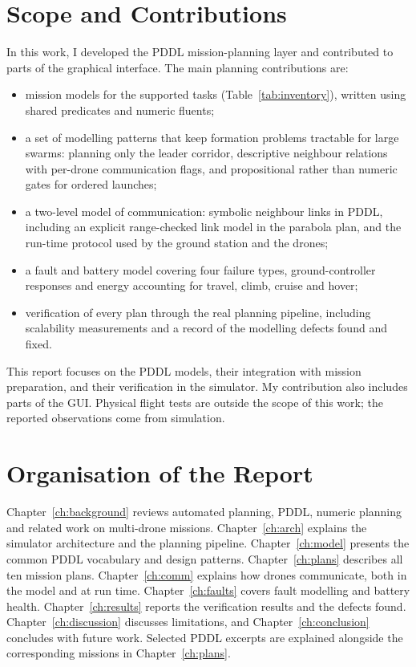 \documentclass[11pt,a4paper,oneside]{report}
\begin{document}
\section{Scope and Contributions}
In this work, I developed the PDDL mission-planning layer and contributed to parts of
the graphical interface. The main planning contributions are:
\begin{itemize}
  \item mission models for the supported tasks (Table~\ref{tab:inventory}),
        written using shared predicates and numeric fluents;
  \item a set of modelling patterns that keep formation problems tractable for large swarms:
        planning only the leader corridor, descriptive neighbour relations with per-drone
        communication flags, and propositional rather than numeric gates for ordered launches;
  \item a two-level model of communication: symbolic neighbour links in PDDL, including an
        explicit range-checked link model in the parabola plan, and the run-time protocol used
        by the ground station and the drones;
  \item a fault and battery model covering four failure types, ground-controller responses and
        energy accounting for travel, climb, cruise and hover;
  \item verification of every plan through the real planning pipeline, including scalability
        measurements and a record of the modelling defects found and fixed.
\end{itemize}

This report focuses on the PDDL models, their integration with mission preparation,
and their verification in the simulator. My contribution also includes parts of the GUI.
Physical flight tests are outside the scope of this work; the reported observations
come from simulation.

\section{Organisation of the Report}
Chapter~\ref{ch:background} reviews automated planning, PDDL, numeric planning and related work
on multi-drone missions. Chapter~\ref{ch:arch} explains the simulator architecture and the
planning pipeline. Chapter~\ref{ch:model} presents the common PDDL vocabulary and design
patterns. Chapter~\ref{ch:plans} describes all ten mission plans. Chapter~\ref{ch:comm}
explains how drones communicate, both in the model and at run time. Chapter~\ref{ch:faults}
covers fault modelling and battery health. Chapter~\ref{ch:results} reports the verification
results and the defects found. Chapter~\ref{ch:discussion} discusses limitations, and
Chapter~\ref{ch:conclusion} concludes with future work. Selected PDDL excerpts
are explained alongside the corresponding missions in Chapter~\ref{ch:plans}.
\end{document}
